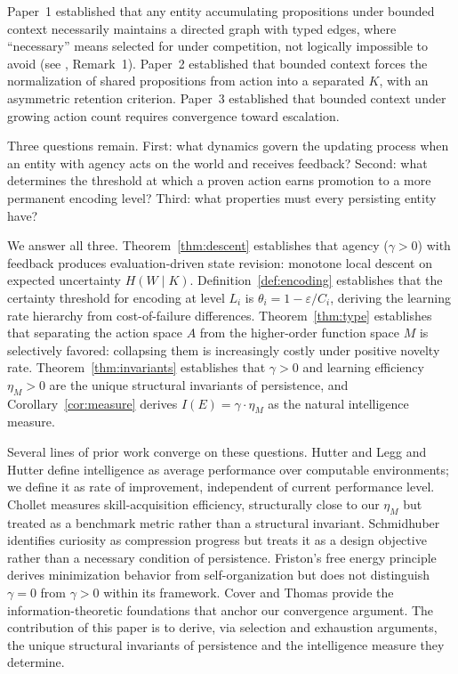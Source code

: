 \documentclass[11pt]{article}
\theoremstyle{definition}
\theoremstyle{remark}
\begin{document}
Paper~1 \cite{McCarthy2026a} established that any entity accumulating
propositions under bounded context necessarily maintains a directed
graph with typed edges, where ``necessary'' means selected for under
competition, not logically impossible to avoid (see \cite{McCarthy2026a},
Remark~1). Paper~2 \cite{McCarthy2026b} established that bounded context forces the
normalization of shared propositions from action into a separated $K$,
with an asymmetric retention criterion. Paper~3 \cite{McCarthy2026c} established that
bounded context under growing action count requires convergence toward
escalation.

Three questions remain. First: what dynamics govern the updating
process when an entity with agency acts on the world and receives
feedback? Second: what determines the threshold at which a proven
action earns promotion to a more permanent encoding level? Third:
what properties must every persisting entity have?

We answer all three. Theorem~\ref{thm:descent} establishes that
agency ($\gamma > 0$) with feedback produces evaluation-driven state
revision: monotone local descent on expected uncertainty
$H(W \mid K)$. Definition~\ref{def:encoding} establishes that the
certainty threshold for encoding at level $L_i$ is
$\theta_i = 1 - \varepsilon / C_i$, deriving the learning rate
hierarchy from cost-of-failure differences.
Theorem~\ref{thm:type} establishes that separating the action space
$A$ from the higher-order function space $M$ is selectively favored:
collapsing them is increasingly costly under positive novelty rate.
Theorem~\ref{thm:invariants} establishes that $\gamma > 0$ and
learning efficiency $\eta_M > 0$ are the unique structural invariants
of persistence, and Corollary~\ref{cor:measure} derives
$I(E) = \gamma \cdot \eta_M$ as the natural intelligence measure.

Several lines of prior work converge on these questions.
Hutter
\cite{Hutter2005} and Legg and Hutter \cite{LeggHutter2007} define
intelligence as average performance over computable environments;
we define it as rate of improvement, independent of current
performance level. Chollet \cite{Chollet2019} measures
skill-acquisition efficiency, structurally close to our $\eta_M$ but
treated as a benchmark metric rather than a structural invariant.
Schmidhuber \cite{Schmidhuber2010} identifies curiosity as compression
progress but treats it as a design objective rather than a necessary
condition of persistence. Friston's free energy principle
\cite{Friston2010} derives minimization behavior from
self-organization but does not distinguish $\gamma = 0$ from
$\gamma > 0$ within its framework. Cover and Thomas \cite{Cover2006}
provide the information-theoretic foundations that anchor our
convergence argument. The contribution of this paper is to derive,
via selection and exhaustion arguments, the unique structural
invariants of persistence and the intelligence measure they determine.
\end{document}
